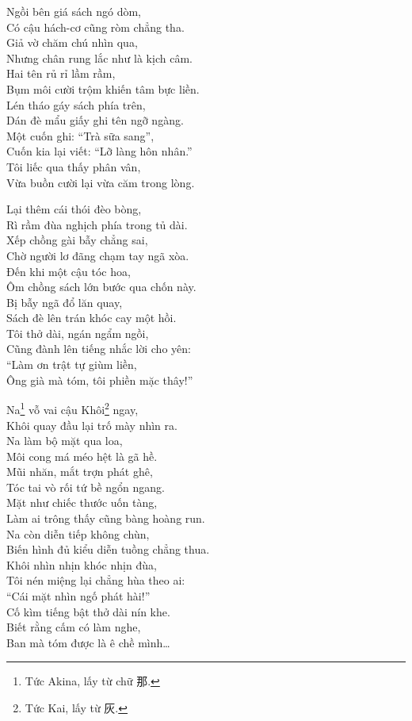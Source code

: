 \documentclass[../main.tex]{subfiles}
\begin{document}
\begin{center}

  Ngồi bên giá sách ngó dòm,\\
  Có cậu hách-cơ cũng ròm chẳng tha.\\
  Giả vờ chăm chú nhìn qua,\\
  Nhưng chân rung lắc như là kịch câm.\\
  Hai tên rủ rỉ lầm rầm,\\
  Bụm môi cười trộm khiến tâm bực liền.\\
  Lén tháo gáy sách phía trên,\\
  Dán đè mẩu giấy ghi tên ngỡ ngàng.\\
  Một cuốn ghi: ``Trà sữa sang'',\\
  Cuốn kia lại viết: ``Lỡ làng hôn nhân.''\\
  Tôi liếc qua thấy phân vân,\\
  Vừa buồn cười lại vừa căm trong lòng.

  Lại thêm cái thói đèo bòng,\\
  Rì rầm đùa nghịch phía trong tủ dài.\\
  Xếp chồng gài bẫy chẳng sai,\\
  Chờ người lơ đãng chạm tay ngã xòa.\\
  Đến khi một cậu tóc hoa,\\
  Ôm chồng sách lớn bước qua chốn này.\\
  Bị bẫy ngã đổ lăn quay,\\
  Sách đè lên trán khóc cay một hồi.\\
  Tôi thở dài, ngán ngẩm ngồi,\\
  Cũng đành lên tiếng nhắc lời cho yên:\\
  ``Làm ơn trật tự giùm liền,\\
  Ông già mà tóm, tôi phiền mặc thây!''

  Na\footnote{Tức Akina, lấy từ chữ 那.} vỗ vai cậu Khôi\footnote{Tức Kai, lấy từ 灰.} ngay,\\
  Khôi quay đầu lại trố mày nhìn ra.\\
  Na làm bộ mặt qua loa,\\
  Môi cong má méo hệt là gã hề.\\
  Mũi nhăn, mắt trợn phát ghê,\\
  Tóc tai vò rối tứ bề ngổn ngang.\\
  Mặt như chiếc thước uốn tàng,\\
  Làm ai trông thấy cũng bàng hoàng run.\\
  Na còn diễn tiếp không chùn,\\
  Biến hình đủ kiểu diễn tuồng chẳng thua.\\
  Khôi nhìn nhịn khóc nhịn đùa,\\
  Tôi nén miệng lại chẳng hùa theo ai:\\
  ``Cái mặt nhìn ngố phát hài!''\\
  Cố kìm tiếng bật thở dài nín khe.\\
  Biết rằng cấm có làm nghe,\\
  Ban mà tóm được là ê chề mình\dots


\end{center}
\end{document}
